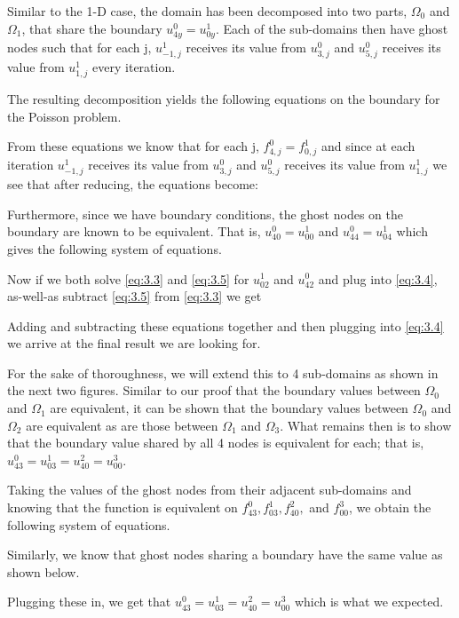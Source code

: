 

Similar to the 1-D case, the domain has been decomposed into two parts, $\Omega_0$ and $\Omega_1$, that share the boundary $u_{4y}^0 = u_{0y}^1$. Each of the sub-domains then have ghost nodes such that for each j, $u_{-1,j}^1$ receives its value from $u_{3,j}^0$ and $u_{5,j}^0$ receives its value from $u_{1,j}^1$ every iteration.


\pagebreak
The resulting decomposition yields the following equations on the boundary for the Poisson problem.


From these equations we know that for each j, $f_{4,j}^0 = f_{0,j}^1$ and since at each iteration $u_{-1,j}^1$ receives its value from $u_{3,j}^0$ and $u_{5,j}^0$ receives its value from $u_{1,j}^1$ we see that after reducing, the equations become:


Furthermore, since we have boundary conditions, the ghost nodes on the boundary are known to be equivalent. That is, $u_{40}^0 = u_{00}^1$ and $u_{44}^0 = u_{04}^1$ which gives the following system of equations.


Now if we both solve \ref{eq:3.3} and \ref{eq:3.5} for $u_{02}^1$ and $u_{42}^0$ and plug into \ref{eq:3.4}, as-well-as subtract \ref{eq:3.5} from \ref{eq:3.3} we get


Adding and subtracting these equations together and then plugging into \ref{eq:3.4} we arrive at the final result we are looking for. 


For the sake of thoroughness, we will extend this to 4 sub-domains as shown in the next two figures. Similar to our proof that the boundary values between $\Omega_0$ and $\Omega_1$ are equivalent, it can be shown that the boundary values between $\Omega_0$ and $\Omega_2$ are equivalent as are those between $\Omega_1$ and $\Omega_3$. What remains then is to show that the boundary value shared by all 4 nodes is equivalent for each; that is, $u_{43}^0 = u_{03}^1 = u_{40}^2 = u_{00}^3$.



\pagebreak
Taking the values of the ghost nodes from their adjacent sub-domains and knowing that the function is equivalent on $f_{43}^0, f_{03}^1, f_{40}^2,$ and $f_{00}^3$, we obtain the following system of equations.


Similarly, we know that ghost nodes sharing a boundary have the same value as shown below.


Plugging these in, we get that $u_{43}^0 = u_{03}^1 = u_{40}^2 = u_{00}^3$ which is what we expected.





